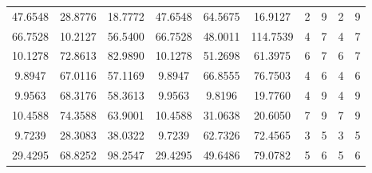\documentclass[withoutpreface,bwprint]{cumcmthesis} %
\begin{document}
\begin{appendices}
\begin{table}[htbp!]
\begin{tabular}{@{}cccccccccc@{}}
							47.6548                          & 28.8776                          & 18.7772                          & 47.6548                          & 64.5675                          & 16.9127                          & 2                    & 9                    & 2                      & 9                      \\
							66.7528                          & 10.2127                          & 56.5400                          & 66.7528                          & 48.0011                          & 114.7539                         & 4                    & 7                    & 4                      & 7                      \\
							10.1278                          & 72.8613                          & 82.9890                          & 10.1278                          & 51.2698                          & 61.3975                          & 6                    & 7                    & 6                      & 7                      \\
							9.8947                           & 67.0116                          & 57.1169                          & 9.8947                           & 66.8555                          & 76.7503                          & 4                    & 6                    & 4                      & 6                      \\
							9.9563                           & 68.3176                          & 58.3613                          & 9.9563                           & 9.8196                           & 19.7760                          & 4                    & 9                    & 4                      & 9                      \\
							10.4588                          & 74.3588                          & 63.9001                          & 10.4588                          & 31.0638                          & 20.6050                          & 7                    & 9                    & 7                      & 9                      \\
							9.7239                           & 28.3083                          & 38.0322                          & 9.7239                           & 62.7326                          & 72.4565                          & 3                    & 5                    & 3                      & 5                      \\
							29.4295                          & 68.8252                          & 98.2547                          & 29.4295                          & 49.6486                          & 79.0782                          & 5                    & 6                    & 5                      & 6                      \\

\end{tabular}
\end{table}
\end{appendices}
\end{document}
